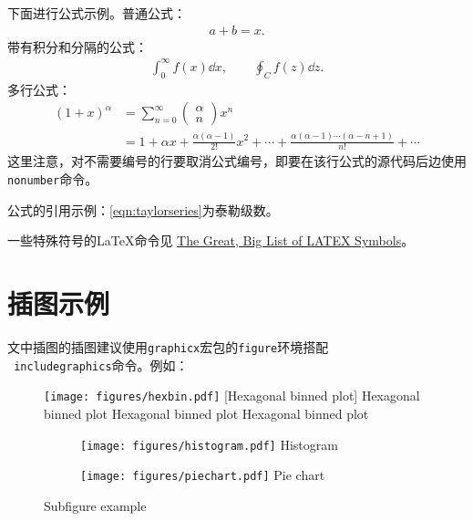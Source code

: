 下面进行公式示例。普通公式：
\begin{align}
    a+b=x.
\end{align}
带有积分和分隔的公式：
\begin{align}
   \int^{\infty}_{0} f(x)\dd{x}, \qquad \oint_{C} f(z)\dd {z}.
\end{align}
多行公式：
\begin{align}
    \left(1+x\right)^{\alpha} &= \sum^{\infty}_{n=0}\left(\begin{matrix} \alpha \\ n\end{matrix}\right)x^n \nonumber \\ 
    &= 1 + \alpha x + \frac{\alpha(\alpha-1)}{2!}x^2 + \cdots + \frac{\alpha(\alpha-1)\cdots(\alpha-n+1)}{n!} + \cdots
    \label{eqn:taylorseries}
\end{align}
这里注意，对不需要编号的行要取消公式编号，即要在该行公式的源代码后边使用\texttt{ nonumber}命令。

公式的引用示例：\ref{eqn:taylorseries}为泰勒级数。

一些特殊符号的\LaTeX{}命令见 \href{https://mirrors.ustc.edu.cn/CTAN/info/symbols/comprehensive/symbols-a4.pdf}{The Great, Big List of LATEX Symbols}。

\section{插图示例}

文中插图的插图建议使用\texttt{graphicx}宏包的\texttt{figure}环境搭配 \\ \texttt{ includegraphics}命令。例如：
\begin{figure}[htbp]
	\centering
	\texttt{[image: figures/hexbin.pdf]}
	[Hexagonal binned plot]
    {Hexagonal binned plot Hexagonal binned plot Hexagonal binned plot}
	\label{fig:hexbin}
\end{figure}
\begin{figure}[htbp]
	\centering
    \begin{subfigure}{0.45\textwidth}
        \centering
	    \texttt{[image: figures/histogram.pdf]}
        {Histogram}
    \end{subfigure}
    \begin{subfigure}{0.45\textwidth}
        \centering
	    \texttt{[image: figures/piechart.pdf]}
        {Pie chart}
    \end{subfigure}
    {Subfigure example}
    \label{fig:subfig}
\end{figure}

